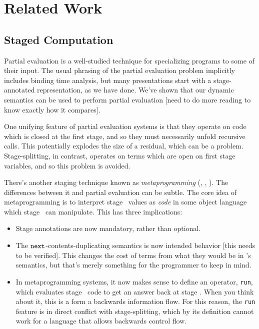 
\section{Related Work}

\subsection {Staged Computation}
Partial evaluation is a well-studied technique for specializing programs to some of their input.  
The usual phrasing of the partial evaluation problem implicitly includes binding time analysis,
but many presentations start with a stage-annotated representation, as we have done.
We've shown that our dynamic semantics can be used to perform partial evaluation 
[need to do more reading to know exactly how it compares].

One unifying feature of partial evaluation systems is that they operate on code which is closed at the first stage,
and so they must necessarily unfold recursive calls.
This potentially explodes the size of a residual, which can be a problem.
Stage-splitting, in contrast, operates on terms which are open on first stage variables,
and so this problem is avoided.

There's another staging technique known as {\em metaprogramming} (\cite{taha-thesis-99}, \cite{devito13}, \cite{davies01}).
The differences between it and partial evaluation can be subtle.
The core idea of metaprogramming is to interpret stage \bbtwo\ values as {\em code} in some object language
which stage \bbone\ can manipulate.
This has three implications:
\begin{itemize}
\item Stage annotations are now mandatory, rather than optional.
\item The ${\tt next}$-contents-duplicating semantics is now intended behavior [this needs to be verified].
This changes the cost of terms from what they would be in \lang's semantics, 
but that's merely something for the programmer to keep in mind.
\item In metaprogramming systems, it now makes sense to define an operator, \texttt{run}, 
which evaluates stage \bbtwo\ code to get an answer back at stage \bbone.
When you think about it, this is a form a backwards information flow.
For this reason, the \texttt{run} feature is in direct conflict with stage-splitting,
which by its definition cannot work for a language that allows backwards control flow.
\end{itemize}

